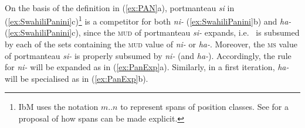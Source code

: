 \documentclass[output=paper
	        ,collection
	        ,collectionchapter
 	        ,biblatex
                ,babelshorthands
                ,newtxmath
                ,draftmode
                ,colorlinks, citecolor=brown
]{langscibook}
\begin{document}
\begin{exe}
\begin{xlist}
\begin{exe}
\begin{xlist}
\begin{exe}
\begin{minipage}[t]{0.4\linewidth} \begin{xlist}
    \end{xlist}
  \end{minipage} ~ \begin{minipage}[t]{0.5\linewidth} \begin{xlist}
    \end{xlist}
  \end{minipage}

\end{exe}

On the basis of the definition in (\ref{ex:PAN}a), portmanteau
\textit{si} in (\ref{ex:SwahiliPanini}c)\footnote{IbM uses the
  notation $m..n$ to represent spans of position classes. See
  \citet{bonami_o-crysmann_b13hpsg} for a proposal of how spans can be made explicit.} is a competitor for both
\textit{ni-} (\ref{ex:SwahiliPanini}b) and \textit{ha-}
(\ref{ex:SwahiliPanini}c), since the \textsc{mud} of portmanteau
\textit{si-} expands, i.e.~ is subsumed by each of the sets containing the \textsc{mud}
value of \textit{ni-} or \textit{ha-}. Moreover, the \textsc{ms} value
of portmanteau \textit{si-} is properly subsumed by \textit{ni-} (and
\textit{ha-}). Accordingly, the rule for \textit{ni-} will be expanded
as in (\ref{ex:PanExp}a).  Similarly, in a first iteration,
\textit{ha-} will be specialised as in (\ref{ex:PanExp}b). 


\end{xlist}
\end{exe}
\end{xlist}
\end{exe}
\end{document}
